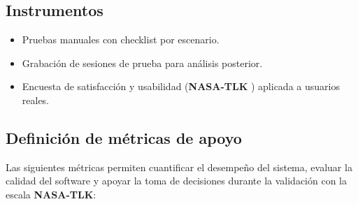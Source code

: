 \subsection{Instrumentos}

\begin{itemize}
    \item Pruebas manuales con checklist por escenario.
    \item Grabación de sesiones de prueba para análisis posterior.
    \item Encuesta de satisfacción y usabilidad (\textbf{NASA-TLK} \cite{Hart1988}) aplicada a usuarios reales.
\end{itemize}

\subsection{Definición de métricas de apoyo}\label{ssc:DMA}

Las siguientes métricas permiten cuantificar el desempeño del sistema, evaluar la calidad del software y apoyar la toma de decisiones durante la validación con la escala \textbf{NASA-TLK}:

